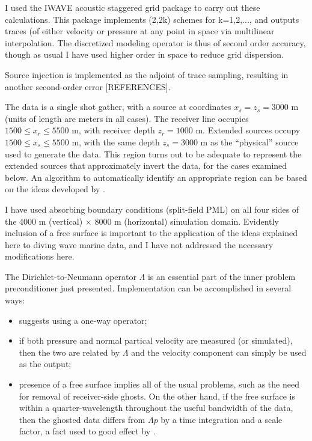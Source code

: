 I used the IWAVE acoustic staggered grid package to carry out these calculations. This package implements (2,2k) schemes for k=1,2,..., and outputs traces (of either velocity or pressure at any point in space via multilinear interpolation. The discretized modeling operator is thus of second order accuracy, though as usual I have used higher order in space to reduce grid dispersion.

Source injection is implemented as the adjoint of trace sampling, resulting in another second-order error [REFERENCES]. 

The data is a single shot gather, with a source at coordinates $x_s=z_s=3000$ m (units of length are meters in all cases). The receiver line occupies $1500 \le x_r \le 5500$ m, with receiver depth $z_r=1000$ m.  Extended sources occupy $1500 \le x_s \le 5500$ m, with the same depth $z_s=3000$ m as the ``physical'' source used to generate the data. This region turns out to be adequate to represent the extended sources that approximately invert the data, for the cases examined below. An algorithm to automatically identify an appropriate region can be based on the ideas developed by \cite{Fu:Geo17}.

I have used absorbing boundary conditions (split-field PML) on all four sides of the 4000 m (vertical) $\times$ 8000 m (horizontal) simulation domain. Evidently inclusion of a free surface is important to the application of the ideas explained here to diving wave marine data, and I have not addressed the necessary modifications here. 

The Dirichlet-to-Neumann operator $\Lambda$ is an essential part of the inner problem preconditioner just presented. Implementation can be accomplished in several ways:
\begin{itemize}
\item \cite{tenKroode:12} suggests using a one-way operator;
\item if both pressure and normal partical velocity are measured (or simulated), then the two are related by $\Lambda$ and the velocity component can simply be used as the output;
\item presence of a free surface implies all of the usual problems, such as the need for removal of receiver-side ghosts. On the other hand, if the free surface is within a quarter-wavelength throughout the useful bandwidth of the data, then the ghosted data differs from $\Lambda p$ by a time integration and a scale factor, a fact used to good effect by \cite{HouSymes:15}.
\end{itemize}

